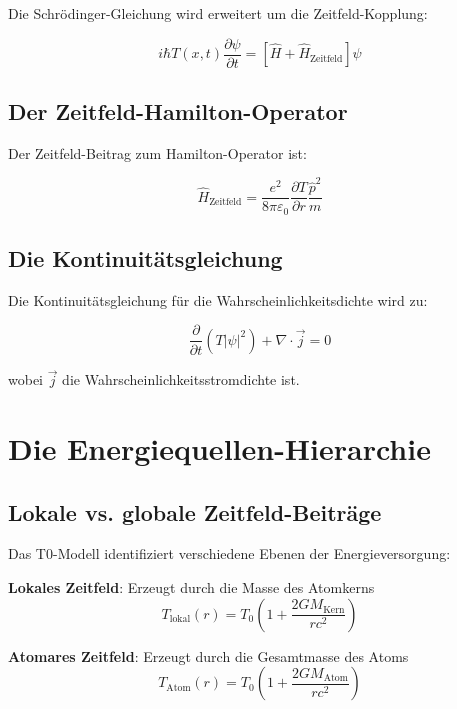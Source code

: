 \documentclass[12pt,a4paper]{report}
\begin{document}
Die Schrödinger-Gleichung wird erweitert um die Zeitfeld-Kopplung:

\begin{equation}
	i\hbar T(x,t)\frac{\partial\psi}{\partial t} = \left[\hat{H} + \hat{H}_{\text{Zeitfeld}}\right]\psi
\end{equation}

\subsection{Der Zeitfeld-Hamilton-Operator}

Der Zeitfeld-Beitrag zum Hamilton-Operator ist:

\begin{equation}
	\hat{H}_{\text{Zeitfeld}} = \frac{e^2}{8\pi\varepsilon_0} \frac{\partial T}{\partial r} \frac{\hat{p}^2}{m}
\end{equation}

\subsection{Die Kontinuitätsgleichung}

Die Kontinuitätsgleichung für die Wahrscheinlichkeitsdichte wird zu:

\begin{equation}
	\frac{\partial}{\partial t}(T|\psi|^2) + \nabla \cdot \vec{j} = 0
\end{equation}

wobei $\vec{j}$ die Wahrscheinlichkeitsstromdichte ist.

\section{Die Energiequellen-Hierarchie}

\subsection{Lokale vs. globale Zeitfeld-Beiträge}

Das T0-Modell identifiziert verschiedene Ebenen der Energieversorgung:

\textbf{Lokales Zeitfeld}: Erzeugt durch die Masse des Atomkerns
\begin{equation}
	T_{\text{lokal}}(r) = T_0\left(1 + \frac{2GM_{\text{Kern}}}{rc^2}\right)
\end{equation}

\textbf{Atomares Zeitfeld}: Erzeugt durch die Gesamtmasse des Atoms
\begin{equation}
	T_{\text{Atom}}(r) = T_0\left(1 + \frac{2GM_{\text{Atom}}}{rc^2}\right)
\end{equation}
\end{document}

